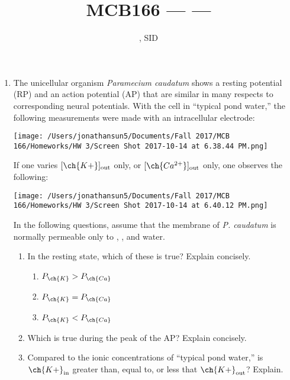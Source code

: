 \documentclass[11pt]{article}
\title{MCB166 --- \Session --- \Homework}
\author{\Name, SID \SID}
\date{\displaydate{date}}
\begin{document}
\maketitle

\newpage
\begin{enumerate}[label=\arabic*.]
\item
The unicellular organism \textit{Paramecium caudatum} shows a resting potential (RP) and an action potential (AP) that are similar in many respects to corresponding neural potentials. With the cell in ``typical pond water,'' the following measurements were made with an intracellular electrode:
\begin{center}
\texttt{[image: /Users/jonathansun5/Documents/Fall 2017/MCB 166/Homeworks/HW 3/Screen Shot 2017-10-14 at 6.38.44 PM.png]}
\end{center}
If one varies $[\ch{K+}]_{\text{out}}$ only, or $[\ch{Ca^{2+}}]_{\text{out}}$ only, one observes the following:
\begin{center}
\texttt{[image: /Users/jonathansun5/Documents/Fall 2017/MCB 166/Homeworks/HW 3/Screen Shot 2017-10-14 at 6.40.12 PM.png]}
\end{center}
In the following questions, assume that the membrane of \textit{P. caudatum} is normally permeable only to , , and water.
\begin{enumerate}[label=(\alph*)]
\item
In the resting state, which of these is true? Explain concisely.
\begin{enumerate}[label=\roman*.]
\item
$P_{\ch{K}} > P_{\ch{Ca}}$
\item
$P_{\ch{K}} = P_{\ch{Ca}}$
\item
$P_{\ch{K}} < P_{\ch{Ca}}$
\end{enumerate}







\item
Which is true during the peak of the AP? Explain concisely.









\item
Compared to the ionic concentrations of ``typical pond water,'' is $\ch{K+}_{\text{in}}$ greater than, equal to, or less that $\ch{K+}_{\text{out}}$? Explain.











\end{enumerate}
\end{enumerate}
\end{document}

